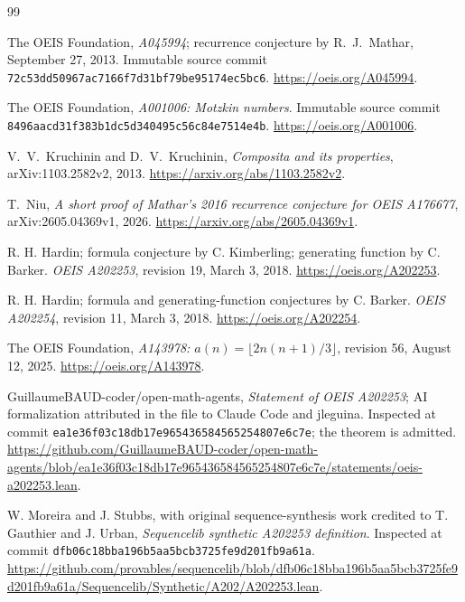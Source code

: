 \documentclass[11pt]{article}
\begin{document}
\begin{thebibliography}{99}
\raggedright
{}
The OEIS Foundation, \emph{A045994}; recurrence conjecture by
R.~J.~Mathar, September 27, 2013.
Immutable source commit
\texttt{72c53dd50967ac7166f7d31bf79be95174ec5bc6}.
\url{https://oeis.org/A045994}.

The OEIS Foundation, \emph{A001006: Motzkin numbers}.
Immutable source commit
\texttt{8496aacd31f383b1dc5d340495c56c84e7514e4b}.
\url{https://oeis.org/A001006}.

V.~V.~Kruchinin and D.~V.~Kruchinin,
\emph{Composita and its properties}, arXiv:1103.2582v2, 2013.
\url{https://arxiv.org/abs/1103.2582v2}.

T.~Niu, \emph{A short proof of Mathar's 2016 recurrence conjecture
for OEIS A176677}, arXiv:2605.04369v1, 2026.
\url{https://arxiv.org/abs/2605.04369v1}.


R. H. Hardin; formula conjecture by C. Kimberling; generating function
by C. Barker. \emph{OEIS A202253}, revision 19, March 3, 2018.
\url{https://oeis.org/A202253}.

R. H. Hardin; formula and generating-function conjectures by C. Barker.
\emph{OEIS A202254}, revision 11, March 3, 2018.
\url{https://oeis.org/A202254}.

The OEIS Foundation, \emph{A143978: $a(n)=\lfloor2n(n+1)/3\rfloor$},
revision 56, August 12, 2025. \url{https://oeis.org/A143978}.

GuillaumeBAUD-coder/open-math-agents, \emph{Statement of OEIS A202253};
AI formalization attributed in the file to Claude Code and jleguina.
Inspected at commit \texttt{ea1e36f03c18db17e965436584565254807e6c7e};
the theorem is admitted.
\url{https://github.com/GuillaumeBAUD-coder/open-math-agents/blob/ea1e36f03c18db17e965436584565254807e6c7e/statements/oeis-a202253.lean}.

W. Moreira and J. Stubbs, with original sequence-synthesis work credited
to T. Gauthier and J. Urban, \emph{Sequencelib synthetic A202253 definition}.
Inspected at commit \texttt{dfb06c18bba196b5aa5bcb3725fe9d201fb9a61a}.
\url{https://github.com/provables/sequencelib/blob/dfb06c18bba196b5aa5bcb3725fe9d201fb9a61a/Sequencelib/Synthetic/A202/A202253.lean}.

\end{thebibliography}
\end{document}
